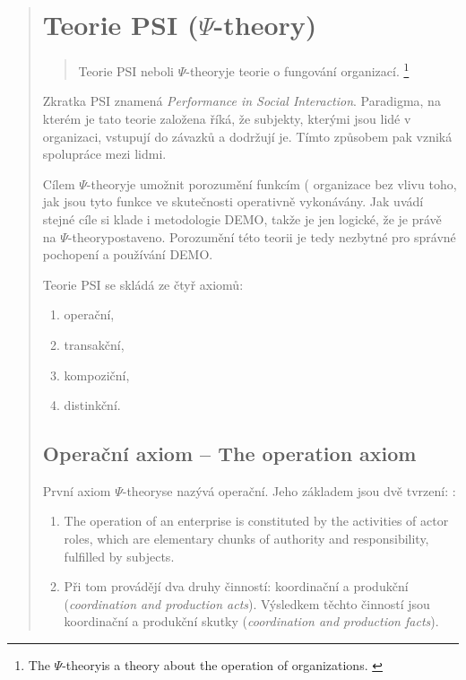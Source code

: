 \documentclass[]{article}
\newcommand{\ptheory}{$\Psi$-theory}
\begin{document}
\begin{quote}
\section{Teorie PSI ($\Psi$-theory)}

\begin{quote}
Teorie PSI neboli \ptheory  je teorie o fungování organizací. \cite{Dietz2005}
\footnote{The \ptheory is a theory about the operation of organizations. \cite{Dietz2005}}
\end{quote}

Zkratka PSI znamená \textit{Performance in Social Interaction}. Paradigma, na kterém je tato teorie založena říká, že subjekty, kterými jsou lidé v organizaci, vstupují do závazků a dodržují je. Tímto způsobem pak vzniká spolupráce mezi lidmi. %

Cílem \ptheory je umožnit porozumění funkcím (%
organizace bez vlivu toho, jak jsou tyto funkce ve skutečnosti operativně vykonávány. Jak uvádí \cite{Vejrazkova2013} stejné cíle si klade i metodologie DEMO, takže je jen logické, že je právě na \ptheory postaveno. Porozumění této teorii je tedy nezbytné pro správné pochopení a používání DEMO.

Teorie PSI se skládá ze čtyř axiomů:

\begin{enumerate}
\item operační,
\item transakční,
\item kompoziční,
\item distinkční.
\end{enumerate}

\subsection{Operační axiom – The operation axiom} \label{sec:operacni_axiom}
První axiom \ptheory se nazývá operační. Jeho základem jsou dvě tvrzení: \cite{Dietz2006}:

\begin{enumerate}
\item The operation of an enterprise is constituted by the activities of actor roles, which are elementary chunks of authority and responsibility, fulfilled by subjects. %
\item Při tom provádějí dva druhy činností: koordinační a produkční (\textit{coordination and production acts}). Výsledkem těchto činností jsou koordinační a produkční skutky (\textit{coordination and production facts}).
\end{enumerate}


\end{quote}
\end{document}
